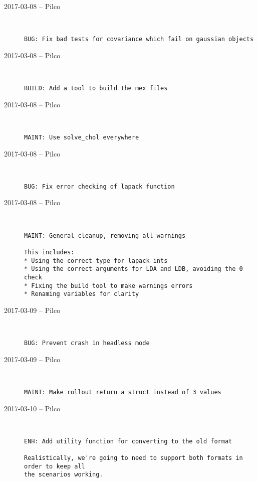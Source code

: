 \begin{description}
  \item[2017-03-08 -- Pilco] \hfill \
\begin{lstlisting}
BUG: Fix bad tests for covariance which fail on gaussian objects
\end{lstlisting}


  \item[2017-03-08 -- Pilco] \hfill \
\begin{lstlisting}
BUILD: Add a tool to build the mex files
\end{lstlisting}


  \item[2017-03-08 -- Pilco] \hfill \
\begin{lstlisting}
MAINT: Use solve_chol everywhere
\end{lstlisting}


  \item[2017-03-08 -- Pilco] \hfill \
\begin{lstlisting}
BUG: Fix error checking of lapack function
\end{lstlisting}


  \item[2017-03-08 -- Pilco] \hfill \
\begin{lstlisting}
MAINT: General cleanup, removing all warnings

This includes:
* Using the correct type for lapack ints
* Using the correct arguments for LDA and LDB, avoiding the 0 check
* Fixing the build tool to make warnings errors
* Renaming variables for clarity
\end{lstlisting}


  \item[2017-03-09 -- Pilco] \hfill \
\begin{lstlisting}
BUG: Prevent crash in headless mode
\end{lstlisting}


  \item[2017-03-09 -- Pilco] \hfill \
\begin{lstlisting}
MAINT: Make rollout return a struct instead of 3 values
\end{lstlisting}


  \item[2017-03-10 -- Pilco] \hfill \
\begin{lstlisting}
ENH: Add utility function for converting to the old format

Realistically, we're going to need to support both formats in order to keep all
the scenarios working.
\end{lstlisting}



\end{description}
